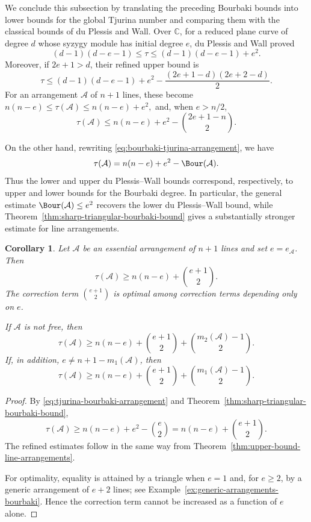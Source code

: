 \documentclass[11pt]{amsart}   %
\newtheorem{Corollary}[Theorem]{Corollary}
\theoremstyle{definition}
\def\NZQ{\mathbb}               %
\def\CC{{\NZQ C}}
\def\A{{\mathcal A}}
\begin{document}
We conclude this subsection by translating the preceding Bourbaki
bounds into lower bounds for the global Tjurina number and comparing
them with the classical bounds of du Plessis and Wall. Over $\CC$, for
a reduced plane curve of degree $d$ whose syzygy module has initial
degree $e$, du Plessis and Wall proved
\cite[Theorem~3.2]{DuPlessis-Wall}
\[
(d-1)(d-e-1) \leq\tau \leq (d-1)(d-e-1)+e^2.
\]
Moreover, if $2e+1>d$, their refined upper bound is
\[
\tau
\leq (d-1)(d-e-1)+e^2 -\frac{(2e+1-d)(2e+2-d)}{2}.
\]
For an arrangement $\A$ of $n+1$ lines, these become $n(n-e)\leq\tau(\A)\leq n(n-e)+e^2,$ and, when $e>n/2$,
\[
\tau(\A)
\leq n(n-e)+e^2-\binom{2e+1-n}{2}.
\]

On the other hand, rewriting \eqref{eq:bourbaki-tjurina-arrangement}, we have
\begin{equation}
\label{eq:tjurina-bourbaki-arrangement}
\tau(\A)=n(n-e)+e^2-\Bour(\A).
\end{equation}
Thus the lower and upper du Plessis--Wall bounds correspond, respectively, to upper and lower bounds for the Bourbaki degree. In particular, the general estimate $\Bour(\A)\leq e^2$ recovers the lower du Plessis--Wall bound, while Theorem~\ref{thm:sharp-triangular-bourbaki-bound} gives a substantially stronger estimate for line arrangements.

\begin{Corollary}
\label{cor:tjurina-lower-bounds-line-arrangements}
Let $\A$ be an essential arrangement of $n+1$ lines and set $e=e_\A$. Then
\[
\tau(\A)\geq
n(n-e)+\binom{e+1}{2}.
\]
The correction term $\binom{e+1}{2}$ is optimal among correction terms depending only on $e$.

If $\A$ is not free, then
\begin{equation}
\label{eq:refined-second-multiplicity-tjurina-bound}
\tau(\A)\geq
n(n-e) +\binom{e+1}{2} +\binom{m_2(\A)-1}{2}.
\end{equation}
If, in addition, $e\neq n+1-m_1(\A)$, then
\begin{equation}
\label{eq:refined-maximal-multiplicity-tjurina-bound}
\tau(\A)\geq
n(n-e) +\binom{e+1}{2} +\binom{m_1(\A)-1}{2}.
\end{equation}
\end{Corollary}

\begin{proof}
By \eqref{eq:tjurina-bourbaki-arrangement} and Theorem~\ref{thm:sharp-triangular-bourbaki-bound},
\[
\tau(\A)
\geq n(n-e)+e^2-\binom e2
=
n(n-e)+\binom{e+1}{2}.
\]
The refined estimates follow in the same way from Theorem~\ref{thm:upper-bound-line-arrangements}.

For optimality, equality is attained by a triangle when $e=1$ and,
for $e\geq2$, by a generic arrangement of $e+2$ lines; see
Example~\ref{ex:generic-arrangements-bourbaki}. Hence the correction
term cannot be increased as a function of $e$ alone.
\end{proof}
\end{document}
